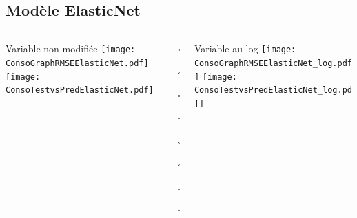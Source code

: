 \documentclass[8pt,aspectratio=169,hyperref={unicode=true}]{beamer}
\begin{document}
\subsection{Modèle ElasticNet}
\begin{frame}{\insertsubsection}
  \begin{columns}[t]
    \begin{column}{.31\textwidth}
      \centering Variable non modifiée
      \texttt{[image: ConsoGraphRMSEElasticNet.pdf]}
      \texttt{[image: ConsoTestvsPredElasticNet.pdf]}
    \end{column}
    \begin{column}{.38\textwidth}
      $\Longleftarrow$

      {\footnotesize
          }

      $\Longleftarrow$

      \raggedleft
      $\Longrightarrow$

      {\footnotesize
          }

      $\Longrightarrow$

      \vspace{1cm}

      \raggedright
      $\Longleftarrow$
      {\scriptsize
          }

      $\Longleftarrow$

      \raggedleft
      $\Longrightarrow$

      {\scriptsize
          
        }

      $\Longrightarrow$
    \end{column}
    \begin{column}{.31\textwidth}
      \centering Variable au log
      \texttt{[image: ConsoGraphRMSEElasticNet\_log.pdf]}
      \texttt{[image: ConsoTestvsPredElasticNet\_log.pdf]}
    \end{column}
  \end{columns}
\end{frame}
\end{document}
